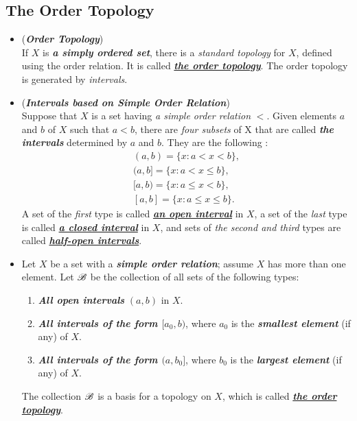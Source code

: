 \documentclass[11pt]{article}
\begin{document}
\subsection{The Order Topology}
\begin{itemize}
\item \begin{example}(\emph{\textbf{Order Topology}})\\
If $X$ is \emph{\textbf{a simply ordered set}}, there is a \emph{standard topology} for $X$, defined using the order relation. It is called \underline{\emph{\textbf{the order topology}}}. The order topology is generated by \emph{intervals}.
\end{example}

\item \begin{definition} (\emph{\textbf{Intervals based on Simple Order Relation}})\\
Suppose that $X$ is a set having \emph{a simple order relation} $<$. Given elements $a$ and $b$ of $X$ such that $a < b$, there are \emph{four subsets} of X that are called \emph{\textbf{the intervals}} determined by $a$ and $b$. They are the following :
\begin{align*}
(a,b) = \{x: a < x < b\},\\
(a,b] = \{x: a < x \le b\},\\
[a,b) = \{x: a \le x < b\},\\
[a, b] = \{x: a \le x \le b\}.
\end{align*}
A set of the \emph{first} type is called \underline{\textit{\textbf{an open interval}}} in $X$, a set of the \emph{last} type is called \underline{\textit{\textbf{a closed interval}}} in $X$, and sets of \emph{the second and third} types are called \underline{\textit{\textbf{half-open intervals}}}.
\end{definition}

\item  \begin{definition}
Let $X$ be a set with a \emph{\textbf{simple order relation}}; assume $X$ has more than one element. Let ${\mathscr B}$ be the collection of all sets of the following types:
\begin{enumerate}
\item \emph{\textbf{All open intervals}} $(a, b)$ in $X$.
\item \emph{\textbf{All intervals of the form $[a_0,b)$}}, where $a_0$ is the \emph{\textbf{smallest element}} (if any) of $X$.
\item \emph{\textbf{All intervals of the form $(a, b_0]$}}, where $b_0$ is the \emph{\textbf{largest element}} (if any) of $X$.
\end{enumerate}
The collection ${\mathscr B}$ is a basis for a topology on $X$, which is called \underline{\emph{\textbf{the order topology}}}.
\end{definition}


\end{itemize}
\end{document}
